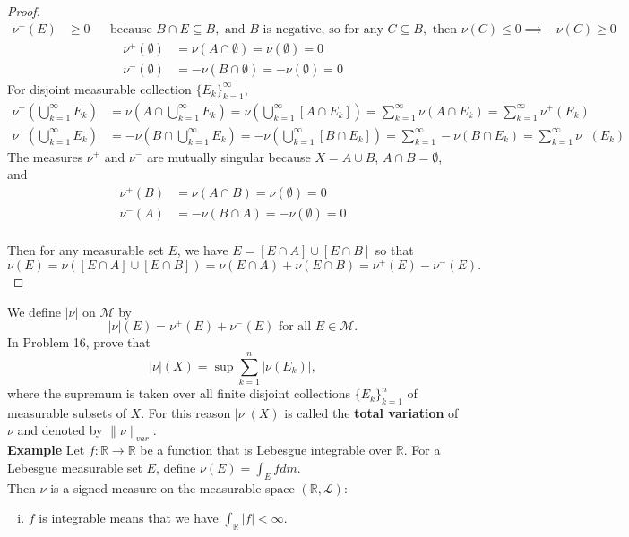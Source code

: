 \begin{flushleft}
\begin{proof}
\begin{align*}
				\nu^-(E)&\ge0&&\text{because }B\cap E\subseteq B,\text{ and }B\text{ is negative, so for any }C\subseteq B,\text{ then }\nu(C)\le0\implies-\nu(C)\ge0
			\end{align*}
			\begin{align*}
				\nu^+(\emptyset)&=\nu(A\cap\emptyset)=\nu(\emptyset)=0\\
				\nu^-(\emptyset)&=-\nu(B\cap\emptyset)=-\nu(\emptyset)=0
			\end{align*}
			For disjoint measurable collection $\{E_k\}_{k=1}^\infty$,
			\begin{align*}
				\nu^+(\bigcup_{k=1}^\infty E_k)&=\nu(A\cap\bigcup_{k=1}^\infty E_k)=\nu(\bigcup_{k=1}^\infty [A\cap E_k])=\sum_{k=1}^\infty\nu(A\cap E_k)=\sum_{k=1}^\infty\nu^+(E_k)\\
				\nu^-(\bigcup_{k=1}^\infty E_k)&=-\nu(B\cap\bigcup_{k=1}^\infty E_k)=-\nu(\bigcup_{k=1}^\infty [B\cap E_k])=\sum_{k=1}^\infty-\nu(B\cap E_k)=\sum_{k=1}^\infty\nu^-(E_k)
			\end{align*}
		The measures $\nu^+$ and $\nu^-$ are mutually singular because $X=A\cup B$, $A\cap B=\emptyset$, and 
		\begin{align*}
			\nu^+(B)&=\nu(A\cap B)=\nu(\emptyset)=0\\
			\nu^-(A)&=-\nu(B\cap A)=-\nu(\emptyset)=0
		\end{align*}
		\\Then for any measurable set $E$, we have $E=[E\cap A]\cup[E\cap B]$ so that 
		\[
			\nu(E)=\nu([E\cap A]\cup[E\cap B])=\nu(E\cap A)+\nu(E\cap B)=\nu^+(E)-\nu^-(E).
		\]
	\end{proof}
	We define $|\nu|$ on $\mathcal{M}$ by
	\[
		|\nu|(E)=\nu^+(E)+\nu^-(E)\text{ for all }E\in\mathcal{M}.
	\]
	In Problem 16, prove that 
	\begin{equation*}
		|\nu|(X)=\sup\sum_{k=1}^n|\nu(E_k)|,\tag{4}
	\end{equation*}
	where the supremum is taken over all finite disjoint collections $\{E_k\}_{k=1}^n$ of measurable subsets of $X$.
	For this reason $|\nu|(X)$ is called the \textbf{total variation} of $\nu$ and denoted by $\|\nu\|_{var}$.
	\\\bigskip
	\textbf{Example}
	Let $f:\mathbb{R}\to\mathbb{R}$ be a function that is Lebesgue integrable over $\mathbb{R}$.
	For a Lebesgue measurable set $E$, define $\nu(E)=\int_E f dm$.
	\\Then $\nu$ is a signed measure on the measurable space $(\mathbb{R},\mathcal{L})$:
	\begin{enumerate}[(i)]
		\item $f$ is integrable means that we have $\int_\mathbb{R}|f|<\infty$.

\end{enumerate}
\end{flushleft}
